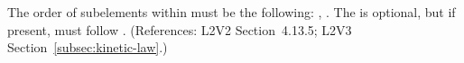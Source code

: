 The order of subelements within \KineticLaw must be the following:
, .  The  is
optional, but if present, must follow .  (References: L2V2
Section~4.13.5; L2V3 Section~\ref{subsec:kinetic-law}.)
